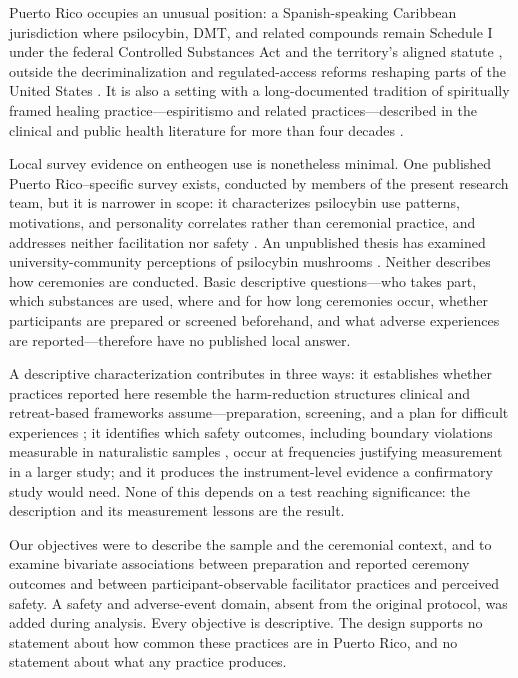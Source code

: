 \documentclass[12pt]{article}
\begin{document}
Puerto Rico occupies an unusual position: a Spanish-speaking Caribbean jurisdiction where psilocybin, DMT,
and related compounds remain Schedule I under the federal Controlled Substances Act
\citep{uscongress1970csa} and the territory's aligned statute \citep{pr1971csa}, outside the
decriminalization and regulated-access reforms reshaping parts of the United States
\citep{siegel2023psychedelic}. It is also a setting with a
long-documented tradition of spiritually framed healing practice---espiritismo and related
practices---described in the clinical and public health literature for more than four decades
\citep{koss1980therapist,comasdiaz1981puertorican,bird1981sociopsychiatry,zerrate2022espiritismo}.

Local survey evidence on entheogen use is nonetheless minimal. One published Puerto Rico--specific survey
exists, conducted by members of the present research team, but it is narrower in scope: it characterizes
psilocybin use patterns, motivations, and personality correlates rather than ceremonial practice, and
addresses neither facilitation nor safety \citep{velezrodriguez2026psilocybin}. An unpublished thesis has
examined university-community perceptions of psilocybin mushrooms \citep{doeltermorales2020hongos}. Neither
describes how ceremonies are conducted. Basic descriptive questions---who takes part, which substances are
used, where and for how long ceremonies occur, whether participants are prepared or screened beforehand,
and what adverse experiences are reported---therefore have no published local answer.

A descriptive characterization contributes in three ways: it establishes whether practices reported here
resemble the harm-reduction structures clinical and retreat-based frameworks assume---preparation,
screening, and a plan for difficult experiences \citep{gorman2021psychedelic,pilecki2021ethical,dutton2025harm};
it identifies which safety outcomes, including boundary violations measurable in naturalistic samples
\citep{kruger2025psychedelic,peluso2020reflections}, occur at frequencies justifying measurement in a larger
study; and it produces the instrument-level evidence a confirmatory study would need. None of this depends
on a test reaching significance: the description and its measurement lessons are the result.

Our objectives were to describe the sample and the ceremonial context, and to examine bivariate
associations between preparation and reported ceremony outcomes and between participant-observable
facilitator practices and perceived safety. A safety and adverse-event domain, absent from the original
protocol, was added during analysis. Every objective is descriptive. The design supports no statement about
how common these practices are in Puerto Rico, and no statement about what any practice produces.
\end{document}
